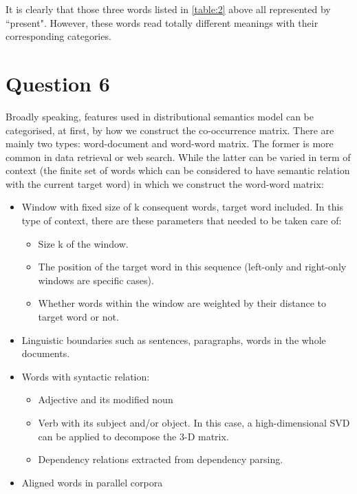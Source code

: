 \documentclass[12pt]{article}
\begin{document}
It is clearly that those three words listed in \ref{table:2} above all represented by ``present". However, these words read totally different meanings with their corresponding categories.

\section{Question 6}

Broadly speaking, features used in distributional semantics model can be categorised, at first, by how we construct the co-occurrence matrix. There are mainly two types: word-document and word-word matrix. The former is more common in data retrieval or web search. While the latter can be varied in term of context (the finite set of words which can be considered to have semantic relation with the current target word) in which we construct the word-word matrix:
\begin{itemize}
	\item Window with fixed size of k consequent words, target word included. In this type of context, there are these parameters that needed to be taken care of:
		\begin{itemize}
			\item Size k of the window.
			\item The position of the target word in this sequence (left-only and right-only windows are specific cases).
			\item Whether words within the window are weighted by their distance to target word or not.
		\end{itemize}
	\item Linguistic boundaries such as sentences, paragraphs, words in the whole documents.
	\item Words with syntactic relation:
		\begin{itemize}
			\item Adjective and its modified noun
			\item Verb with its subject and/or object. In this case, a high-dimensional SVD can be applied to decompose the 3-D matrix.
			\item Dependency relations extracted from dependency parsing.
		\end{itemize}
	\item Aligned words in parallel corpora
\end{itemize}
\end{document}
